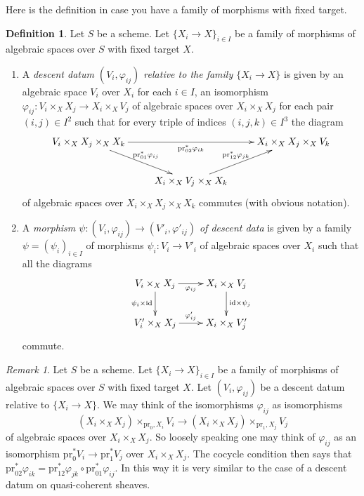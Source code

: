\documentclass{stacks-project}
\theoremstyle{plain}
\theoremstyle{definition}
\newtheorem{definition}[subsection]{Definition}
\theoremstyle{remark}
\newtheorem{remark}[subsection]{Remark}
\numberwithin{equation}{subsection}
\begin{document}
\noindent
Here is the definition in case you have a family of morphisms
with fixed target.

\begin{definition}
\label{definition-descent-datum-for-family-of-morphisms}
Let $S$ be a scheme.
Let $\{X_i \to X\}_{i \in I}$ be a family of morphisms
of algebraic spaces over $S$ with fixed target $X$.
\begin{enumerate}
\item A {\it descent datum $(V_i, \varphi_{ij})$ relative to the
family $\{X_i \to X\}$} is given by an algebraic space $V_i$ over $X_i$
for each $i \in I$, an isomorphism
$\varphi_{ij} : V_i \times_X X_j \to X_i \times_X V_j$
of algebraic spaces over $X_i \times_X X_j$ for each pair $(i, j) \in I^2$
such that for every triple of indices $(i, j, k) \in I^3$
the diagram
$$
\xymatrix{
V_i \times_X X_j \times_X X_k
\ar[rd]^{\text{pr}_{01}^*\varphi_{ij}}
\ar[rr]_{\text{pr}_{02}^*\varphi_{ik}} &
&
X_i \times_X X_j \times_X V_k\\
&
X_i \times_X V_j \times_X X_k
\ar[ru]^{\text{pr}_{12}^*\varphi_{jk}}
}
$$
of algebraic spaces over $X_i \times_X X_j \times_X X_k$ commutes
(with obvious notation).
\item A {\it morphism
$\psi : (V_i, \varphi_{ij}) \to (V'_i, \varphi'_{ij})$
of descent data} is given by a family $\psi = (\psi_i)_{i \in I}$
of morphisms $\psi_i : V_i \to V'_i$ of algebraic spaces over $X_i$
such that all the diagrams
$$
\xymatrix{
V_i \times_X X_j \ar[r]_{\varphi_{ij}} \ar[d]_{\psi_i \times \text{id}} &
X_i \times_X V_j \ar[d]^{\text{id} \times \psi_j} \\
V'_i \times_X X_j \ar[r]^{\varphi'_{ij}} & X_i \times_X V'_j
}
$$
commute.
\end{enumerate}
\end{definition}

\begin{remark}
\label{remark-easier-family}
Let $S$ be a scheme.
Let $\{X_i \to X\}_{i \in I}$ be a family of morphisms
of algebraic spaces over $S$ with fixed target $X$.
Let $(V_i, \varphi_{ij})$ be a descent datum relative to
$\{X_i \to X\}$. We may think of the isomorphisms $\varphi_{ij}$
as isomorphisms
$$
(X_i \times_X X_j) \times_{\text{pr}_0, X_i} V_i
\longrightarrow
(X_i \times_X X_j) \times_{\text{pr}_1, X_j} V_j
$$
of algebraic spaces over $X_i \times_X X_j$. So loosely speaking one may
think of $\varphi_{ij}$ as an isomorphism
$\text{pr}_0^*V_i \to \text{pr}_1^*V_j$ over $X_i \times_X X_j$.
The cocycle condition then says that
$\text{pr}_{02}^*\varphi_{ik} =
\text{pr}_{12}^*\varphi_{jk} \circ \text{pr}_{01}^*\varphi_{ij}$.
In this way it is very similar to the case of a descent datum on
quasi-coherent sheaves.
\end{remark}
\end{document}
